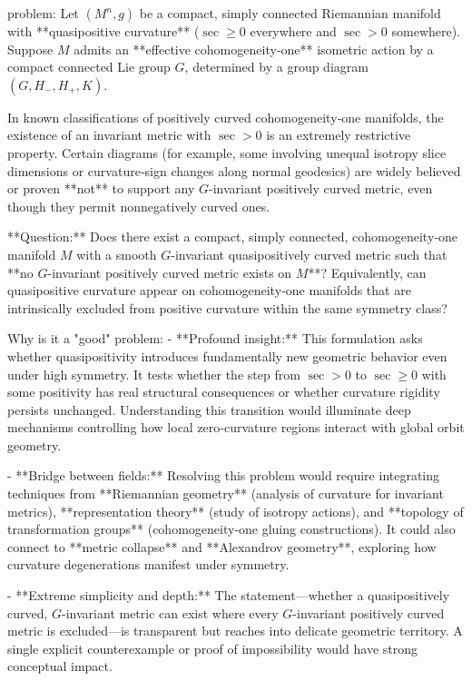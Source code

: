 problem:  
Let \( (M^n,g) \) be a compact, simply connected Riemannian manifold with **quasipositive curvature** (\(\sec \ge 0\) everywhere and \(\sec > 0\) somewhere).  Suppose \(M\) admits an **effective cohomogeneity‑one** isometric action by a compact connected Lie group \(G\), determined by a group diagram \((G,H_-,H_+,K)\).  

In known classifications of positively curved cohomogeneity‑one manifolds, the existence of an invariant metric with \(\sec>0\) is an extremely restrictive property.  Certain diagrams (for example, some involving unequal isotropy slice dimensions or curvature‑sign changes along normal geodesics) are widely believed or proven **not** to support any \(G\)-invariant positively curved metric, even though they permit nonnegatively curved ones.  

**Question:**  
Does there exist a compact, simply connected, cohomogeneity‑one manifold \(M\) with a smooth \(G\)-invariant quasipositively curved metric such that **no \(G\)-invariant positively curved metric exists on \(M\)**?  
Equivalently, can quasipositive curvature appear on cohomogeneity‑one manifolds that are intrinsically excluded from positive curvature within the same symmetry class?

Why is it a "good" problem:  
- **Profound insight:**  
  This formulation asks whether quasipositivity introduces fundamentally new geometric behavior even under high symmetry.  It tests whether the step from \(\sec>0\) to \(\sec\ge0\) with some positivity has real structural consequences or whether curvature rigidity persists unchanged.  Understanding this transition would illuminate deep mechanisms controlling how local zero‑curvature regions interact with global orbit geometry.  

- **Bridge between fields:**  
  Resolving this problem would require integrating techniques from **Riemannian geometry** (analysis of curvature for invariant metrics), **representation theory** (study of isotropy actions), and **topology of transformation groups** (cohomogeneity‑one gluing constructions).  It could also connect to **metric collapse** and **Alexandrov geometry**, exploring how curvature degenerations manifest under symmetry.  

- **Extreme simplicity and depth:**  
  The statement—whether a quasipositively curved, \(G\)-invariant metric can exist where every \(G\)-invariant positively curved metric is excluded—is transparent but reaches into delicate geometric territory.  A single explicit counterexample or proof of impossibility would have strong conceptual impact.  

